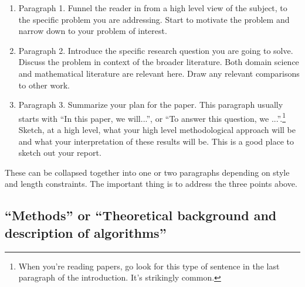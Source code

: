\documentclass[]{article}
\begin{document}
\begin{enumerate}
    \item Paragraph 1. Funnel the reader in from a high level view of the subject, to the specific problem you are addressing. Start to motivate the problem and narrow down to your problem of interest.
    \item Paragraph 2. Introduce the specific research question you are going to solve. Discuss the problem in context of the broader literature. Both domain science and mathematical literature are relevant here. Draw any relevant comparisons to other work.
    \item Paragraph 3. Summarize your plan for the paper. This paragraph usually starts with ``In this paper, we will...'', or ``To answer this question, we ...''.\footnote{When you're reading papers, go look for this type of sentence in the last paragraph of the introduction. It's strikingly common.}
          Sketch, at a high level, what your high level methodological approach will be and what your interpretation of these results will be. This is a good place to sketch out your report.
\end{enumerate}
These can be collapsed together into one or two paragraphs depending on style and length constraints. The important thing is to address the three points above.

\subsection{``Methods'' or ``Theoretical background and description of algorithms''}
\end{document}
